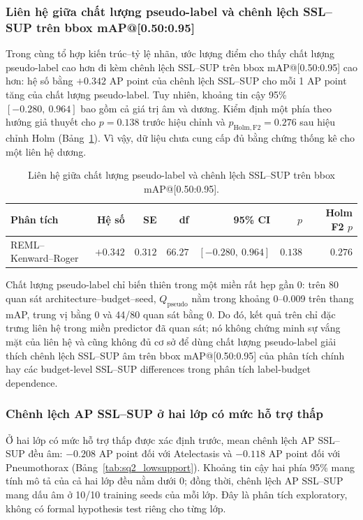 \documentclass[pdflatex,sn-mathphys-num]{sn-jnl}%
\theoremstyle{thmstyleone}%
\theoremstyle{thmstyletwo}%
\theoremstyle{thmstylethree}%
\begin{document}
\subsubsection{Liên hệ giữa chất lượng pseudo-label và chênh lệch SSL--SUP trên bbox mAP@[0.50:0.95]}

Trong cùng tổ hợp kiến trúc--tỷ lệ nhãn, ước lượng điểm cho thấy chất lượng pseudo-label cao hơn đi kèm chênh lệch SSL--SUP trên bbox mAP@[0.50:0.95] cao hơn: hệ số bằng $+0.342$ AP point của chênh lệch SSL--SUP cho mỗi 1 AP point tăng của chất lượng pseudo-label. Tuy nhiên, khoảng tin cậy 95\% $[-0.280,\ 0.964]$ bao gồm cả giá trị âm và dương. Kiểm định một phía theo hướng giả thuyết cho $p=0.138$ trước hiệu chỉnh và $p_{\mathrm{Holm,F2}}=0.276$ sau hiệu chỉnh Holm (Bảng~\ref{tab:sq2_qpseudo}). Vì vậy, dữ liệu chưa cung cấp đủ bằng chứng thống kê cho một liên hệ dương.

\begin{table}[htbp]
\centering
\caption{Liên hệ giữa chất lượng pseudo-label và chênh lệch SSL--SUP trên bbox mAP@[0.50:0.95].}
\label{tab:sq2_qpseudo}
\small
\begin{tabular}{lrrrrrr}
\toprule
\textbf{Phân tích} & \textbf{Hệ số} & \textbf{SE} & \textbf{df} & \textbf{95\% CI} & \textbf{$p$} & \textbf{Holm F2 $p$}\\
\midrule
REML--Kenward--Roger & $+0.342$ & $0.312$ & $66.27$ & $[-0.280,\ 0.964]$ & $0.138$ & $0.276$\\
\bottomrule
\end{tabular}
\end{table}

Chất lượng pseudo-label chỉ biến thiên trong một miền rất hẹp gần 0: trên 80 quan sát architecture--budget--seed, $Q_{\mathrm{pseudo}}$ nằm trong khoảng 0--0.009 trên thang mAP, trung vị bằng 0 và 44/80 quan sát bằng 0. Do đó, kết quả trên chỉ đặc trưng liên hệ trong miền predictor đã quan sát; nó không chứng minh sự vắng mặt của liên hệ và cũng không đủ cơ sở để dùng chất lượng pseudo-label giải thích chênh lệch SSL--SUP âm trên bbox mAP@[0.50:0.95] của phân tích chính hay các budget-level SSL--SUP differences trong phân tích label-budget dependence.

\subsubsection{Chênh lệch AP SSL--SUP ở hai lớp có mức hỗ trợ thấp}

Ở hai lớp có mức hỗ trợ thấp được xác định trước, mean chênh lệch AP SSL--SUP đều âm: $-0.208$ AP point đối với Atelectasis và $-0.118$ AP point đối với Pneumothorax (Bảng~\ref{tab:sq2_lowsupport}). Khoảng tin cậy hai phía 95\% mang tính mô tả của cả hai lớp đều nằm dưới 0; đồng thời, chênh lệch AP SSL--SUP mang dấu âm ở 10/10 training seeds của mỗi lớp. Đây là phân tích exploratory, không có formal hypothesis test riêng cho từng lớp.
\end{document}
